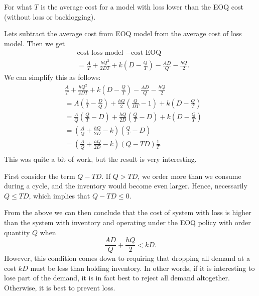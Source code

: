 \begin{uncomment}
  
\begin{exercise}[\faRocket] For what $T$ is the  average cost for a model with loss lower than the EOQ cost (without loss or backlogging).
  \begin{solution}
Lets subtract the average cost from EOQ model from the average cost of loss model. Then we get
  \begin{align*}
&\text{cost loss model } - \text{cost EOQ} \\
&=\frac A T + \frac{hQ^2}{2DT}+k\left(D-\frac Q T\right)  - \frac{A D}{Q} - \frac{h Q}{2}.
  \end{align*}
We can simplify this as follows: 
\begin{align*}
&\frac A T + \frac{hQ^2}{2DT}+k\left(D-\frac Q T\right)  - \frac{A D}{Q} - \frac{h Q}{2} \\
&= A \left(\frac 1 T - \frac D Q\right) + \frac{h Q} 2 \left(\frac{Q}{DT}-1\right)+k\left(D-\frac Q   T\right) \\
&= \frac A Q \left(\frac Q T - D \right) + \frac{h Q} {2D} \left(\frac{Q}{T}- D \right)+k\left(D-\frac Q  T\right)  \\
&= \left(\frac A Q + \frac{h Q} {2D} -k \right) \left(\frac{Q}{T}- D \right) \\
&= \left(\frac A Q + \frac{h Q} {2D} -k \right) \left(Q- T D \right)\frac 1 T. \\
\end{align*}
This was quite a bit of work, but the result is very interesting. 

First consider the term $Q-T D$. If $Q > T D$, we order more than we consume during a cycle, and the inventory would become even larger. Hence, necessarily $Q\leq T D$, which implies that $Q-T D\leq 0$. 

From the above we can then conclude that the cost of system with loss is higher than the system with inventory and operating under the EOQ policy with order quantity $Q$  when
\begin{equation*}
  \frac{AD} Q + \frac{h Q} {2} < k D.
\end{equation*}
However, this condition comes down to requiring that dropping all demand at a cost $kD$ must be less than holding inventory. In other words, if it is interesting to lose part of the demand, it is in fact best to reject all demand altogether. Otherwise, it is best to prevent loss. 


\end{solution}
\end{exercise}
\end{uncomment}

